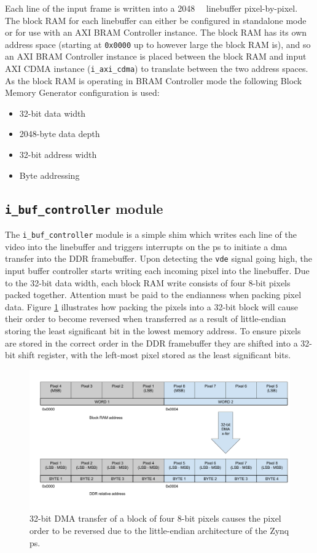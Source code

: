 Each line of the input frame is written into a \SI{2048}{\kilo\byte} linebuffer pixel-by-pixel. The block RAM for each linebuffer can either be configured in standalone mode or for use with an AXI BRAM Controller instance. The block RAM has its own address space (starting at \texttt{0x0000} up to however large the block RAM is), and so an AXI BRAM Controller instance is placed between the block RAM and input AXI CDMA instance (\texttt{i\_axi\_cdma}) to translate between the two address spaces. As the block RAM is operating in BRAM Controller mode the following Block Memory Generator configuration is used:
\begin{itemize}
  \item 32-bit data width
  \item 2048-byte data depth
  \item 32-bit address width
  \item Byte addressing
\end{itemize}

\subsection{\texttt{i\_buf\_controller} module}
The \texttt{i\_buf\_controller} module is a simple shim which writes each line of the video into the linebuffer and triggers interrupts on the \gls{ps} to initiate a \gls{dma} transfer into the DDR framebuffer. Upon detecting the \texttt{vde} signal going high, the input buffer controller starts writing each incoming pixel into the linebuffer. Due to the 32-bit data width, each block RAM write consists of four 8-bit pixels packed together. Attention must be paid to the endianness when packing pixel data. Figure \ref{fig:dma_endianness} illustrates how packing the pixels into a 32-bit block will cause their order to become reversed when transferred as a result of little-endian storing the least significant bit in the lowest memory address. To ensure pixels are stored in the correct order in the DDR framebuffer they are shifted into a 32-bit shift register, with the left-most pixel stored as the least significant bits.

\begin{figure}
  \centering
  \includegraphics[width=1\textwidth]{./img/dma_endianness.png}
  \caption{32-bit DMA transfer of a block of four 8-bit pixels causes the pixel order to be reversed due to the little-endian architecture of the Zynq \gls{ps}.}
  \label{fig:dma_endianness}
\end{figure}

